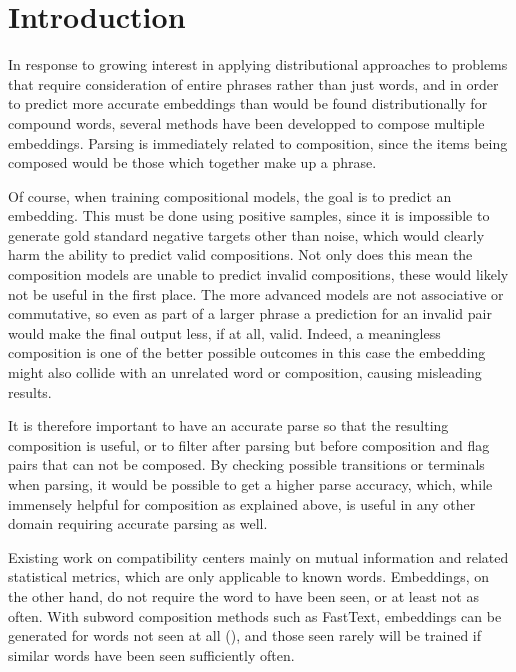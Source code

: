 \documentclass[a4paper, 12pt]{article}
\begin{document}


\section{Introduction}

In response to growing interest in applying distributional approaches to problems that require consideration of entire phrases rather than just words, and in order to predict more accurate embeddings than would be found distributionally for compound words, several methods have been developped to compose multiple embeddings. Parsing is immediately related to composition, since the items being composed would be those which together make up a phrase.

Of course, when training compositional models, the goal is to predict an embedding. This must be done using positive samples, since it is impossible to generate gold standard negative targets other than noise, which would clearly harm the ability to predict valid compositions. Not only does this mean the composition models are unable to predict invalid compositions, these would likely not be useful in the first place. The more advanced models are not associative or commutative, so even as part of a larger phrase a prediction for an invalid pair would make the final output less, if at all, valid. Indeed, a meaningless composition is one of the better possible outcomes in this case \textemdash the embedding might also collide with an unrelated word or composition, causing misleading results.

It is therefore important to have an accurate parse so that the resulting composition is useful, or to filter after parsing but before composition and flag pairs that can not be composed. By checking possible transitions or terminals when parsing, it would be possible to get a higher parse accuracy, which, while immensely helpful for composition as explained above, is useful in any other domain requiring accurate parsing as well.

Existing work on compatibility centers mainly on mutual information and related statistical metrics, which are only applicable to known words. Embeddings, on the other hand, do not require the word to have been seen, or at least not as often. With subword composition methods such as FastText, embeddings can be generated for words not seen at all (\cite{FastText}), and those seen rarely will be trained if similar words have been seen sufficiently often.
\end{document}

